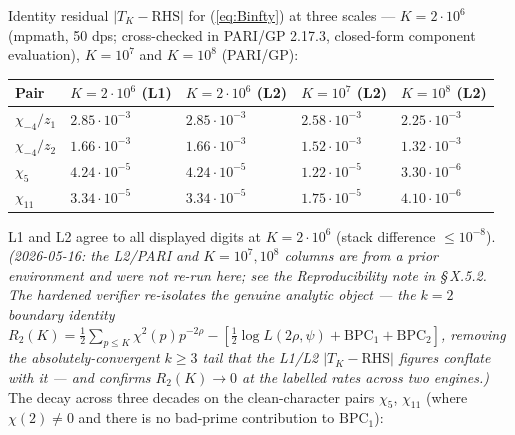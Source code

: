 Identity residual \(|T_K - \mathrm{RHS}|\) for (\ref{eq:Binfty}) at
three scales --- \(K = 2 \cdot 10^{6}\) (mpmath, 50 dps; cross-checked
in PARI/GP 2.17.3, closed-form component evaluation), \(K = 10^{7}\)
and \(K = 10^{8}\) (PARI/GP):

{\def\LTcaptype{none} %
\begin{longtable}[]{@{}
  >{\raggedright\arraybackslash}p{}
  >{\raggedleft\arraybackslash}p{}
  >{\raggedleft\arraybackslash}p{}
  >{\raggedleft\arraybackslash}p{}
  >{\raggedleft\arraybackslash}p{}@{}}
\toprule\noalign{}
\begin{minipage}[b]{\linewidth}\raggedright
Pair
\end{minipage} & \begin{minipage}[b]{\linewidth}\raggedleft
\(K = 2 \cdot 10^{6}\) (L1)
\end{minipage} & \begin{minipage}[b]{\linewidth}\raggedleft
\(K = 2 \cdot 10^{6}\) (L2)
\end{minipage} & \begin{minipage}[b]{\linewidth}\raggedleft
\(K = 10^{7}\) (L2)
\end{minipage} & \begin{minipage}[b]{\linewidth}\raggedleft
\(K = 10^{8}\) (L2)
\end{minipage} \\
\midrule\noalign{}
\endhead
\bottomrule\noalign{}
\endlastfoot
\(\chi_{-4}/z_1\) & \(2.85 \cdot 10^{-3}\) & \(2.85 \cdot 10^{-3}\) & \(2.58 \cdot 10^{-3}\) & \(2.25 \cdot 10^{-3}\) \\
\(\chi_{-4}/z_2\) & \(1.66 \cdot 10^{-3}\) & \(1.66 \cdot 10^{-3}\) & \(1.52 \cdot 10^{-3}\) & \(1.32 \cdot 10^{-3}\) \\
\(\chi_5\) & \(4.24 \cdot 10^{-5}\) & \(4.24 \cdot 10^{-5}\) & \(1.22 \cdot 10^{-5}\) & \(3.30 \cdot 10^{-6}\) \\
\(\chi_{11}\) & \(3.34 \cdot 10^{-5}\) & \(3.34 \cdot 10^{-5}\) & \(1.75 \cdot 10^{-5}\) & \(4.10 \cdot 10^{-6}\) \\
\end{longtable}
}

L1 and L2 agree to all displayed digits at \(K = 2 \cdot 10^{6}\)
(stack difference \(\le 10^{-8}\)). \emph{(2026-05-16: the L2/PARI and
\(K=10^{7},10^{8}\) columns are from a prior environment and were not
re-run here; see the Reproducibility note in \S\,X.5.2. The hardened
verifier re-isolates the genuine analytic object --- the \(k=2\)
boundary identity \(R_2(K)=\tfrac12\sum_{p\le K}\chi^2(p)p^{-2\rho}
-[\tfrac12\log L(2\rho,\psi)+\mathrm{BPC}_1+\mathrm{BPC}_2]\),
removing the absolutely-convergent \(k\ge3\) tail that the L1/L2
\(|T_K-\mathrm{RHS}|\) figures conflate with it --- and confirms
\(R_2(K)\to0\) at the labelled rates across two engines.)} The decay across three decades
on the clean-character pairs \(\chi_5\), \(\chi_{11}\) (where
\(\chi(2) \ne 0\) and there is no bad-prime contribution to
\(\mathrm{BPC}_1\)):

